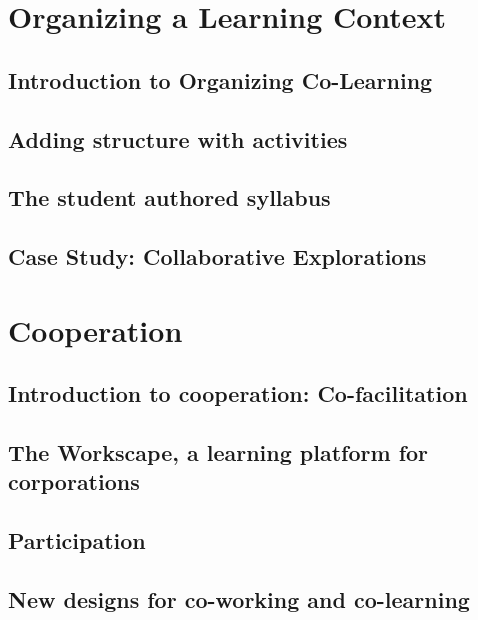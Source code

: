 \documentclass[ebook, 12pt, twoside]{memoir}
\begin{document}
\part{Organizing a Learning Context} \label{organizing-part} %
%
\chapter[\textbf{Organizing Co-Learning}]{Introduction to Organizing Co-Learning}

%
\chapter[\textbf{Adding structure}]{Adding structure with activities}
%

%
\chapter[\textbf{The student authored syllabus}]{ The student authored syllabus } 
%

%
\chapter[\textbf{Case Study: Collaborative Explorations}]{ Case Study: Collaborative Explorations}
%


\part{Cooperation} \label{cooperation-part} %
%
\chapter[\textbf{Co-facilitation}]{Introduction to cooperation: Co-facilitation}

%
\chapter[\textbf{The Workscape}]{ The Workscape, a learning platform for corporations }
%

\chapter[\textbf{Participation}]{ Participation }
%

%
\chapter[\textbf{Designs for co-working}]{New designs for co-working and co-learning}
%

%
\end{document}
